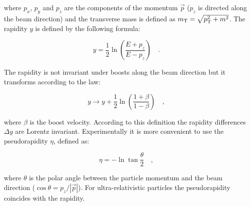 where $p_x$, $p_y$ and $p_z$ are the components of the momentum $\vec{p}$ ($p_z$ is directed along the beam direction) and the transverse mass is defined as $m_\mathrm{T} = \sqrt{p_\mathrm{T}^2 + m^2}$. The rapidity $y$ is defined by the following formula:

\begin{equation}
y = \frac{1}{2} \ln \left(  \frac{E+p_z}{E-p_z} \right) \quad .
\end{equation}

The rapidity is not invariant under boosts along the beam direction but it transforms according to the law:

\begin{equation}
y \longrightarrow y + \frac{1}{2} \ln \left(  \frac{1+\beta}{1-\beta} \right) \quad ,
\end{equation}

where $\beta$ is the boost velocity. According to this definition the rapidity differences $\Delta y$ are Lorentz invariant. Experimentally it is more convenient to use the pseudorapidity $\eta$, defined as:

\begin{equation}
\eta = - \ln \tan \frac{\theta}{2} \quad ,
\end{equation}

where $\theta$ is the polar angle between the particle momentum and the beam direction ($\cos \theta = p_z/|\vec{p}|$). For ultra-relativistic particles the pseudorapidity coincides with the rapidity.








